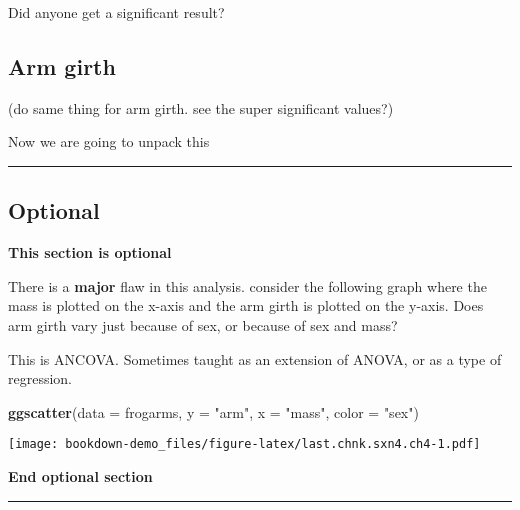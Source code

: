 \documentclass[]{book}
\newenvironment{Shaded}{\begin{snugshade}}{\end{snugshade}}
\newcommand{\KeywordTok}[1]{\textcolor[rgb]{0.13,0.29,0.53}{\textbf{#1}}}
\newcommand{\DataTypeTok}[1]{\textcolor[rgb]{0.13,0.29,0.53}{#1}}
\newcommand{\StringTok}[1]{\textcolor[rgb]{0.31,0.60,0.02}{#1}}
\newcommand{\NormalTok}[1]{#1}
\theoremstyle{definition}
\theoremstyle{definition}
\theoremstyle{definition}
\theoremstyle{remark}
\begin{document}
Did anyone get a significant result?

\subsection{Arm girth}\label{arm-girth}

(do same thing for arm girth. see the super significant values?)

Now we are going to unpack this

\begin{center}\rule{0.5\linewidth}{\linethickness}\end{center}

\subsection{Optional}\label{optional}

\textbf{This section is optional}

There is a \textbf{major} flaw in this analysis. consider the following
graph where the mass is plotted on the x-axis and the arm girth is
plotted on the y-axis. Does arm girth vary just because of sex, or
because of sex and mass?

This is ANCOVA. Sometimes taught as an extension of ANOVA, or as a type
of regression.

\begin{Shaded}
\begin{Highlighting}[]
\KeywordTok{ggscatter}\NormalTok{(}\DataTypeTok{data =}\NormalTok{ frogarms,}
          \DataTypeTok{y =} \StringTok{"arm"}\NormalTok{,}
          \DataTypeTok{x =} \StringTok{"mass"}\NormalTok{,}
          \DataTypeTok{color =} \StringTok{"sex"}\NormalTok{)}
\end{Highlighting}
\end{Shaded}

\texttt{[image: bookdown-demo\_files/figure-latex/last.chnk.sxn4.ch4-1.pdf]}

\textbf{End optional section}

\begin{center}\rule{0.5\linewidth}{\linethickness}\end{center}


\end{document}
